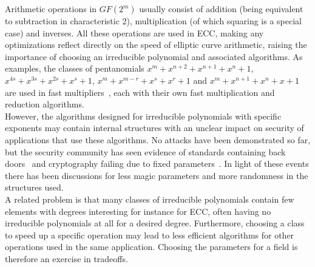 Arithmetic operations in $GF(2^m)$ usually consist of addition (being equivalent to subtraction in characteristic 2), multiplication (of which squaring is a special case) and inverses. All these operations are used in ECC, making any optimizations reflect directly on the speed of elliptic curve arithmetic, raising the importance of choosing an irreducible polynomial and associated algorithms. As examples, the classes of pentanomials $x^m+x^{n+2}+x^{n+1}+x^{n}+1$, $x^{4s}+x^{3s}+x^{2s}+x^s+1$, $x^m+x^{m-r}+x^s+x^r+1$ and $x^m+x^{n+1}+x^n+x+1$ are used in fast multipliers~\cite{fan2015survey}, each with their own fast multiplication and reduction algorithms.\\

However, the algorithms designed for irreducible polynomials with specific exponents may contain internal structures with an unclear impact on security of applications that use these algorithms. No attacks have been demonstrated so far, but the security community has seen evidence of standards containing back doors~\cite{bernstein2016dual} and cryptography failing due to fixed parameters~\cite{adrian2015imperfect}. In light of these events there has been discussions for less magic parameters and more randomness in the structures used.\\

A related problem is that many classes of irreducible polynomials contain few elements with degrees interesting for instance for ECC, often having no irreducible polynomials at all for a desired degree. Furthermore, choosing a class to speed up a specific operation may lead to less efficient algorithms for other operations used in the same application. Choosing the parameters for a field is therefore an exercise in tradeoffs.